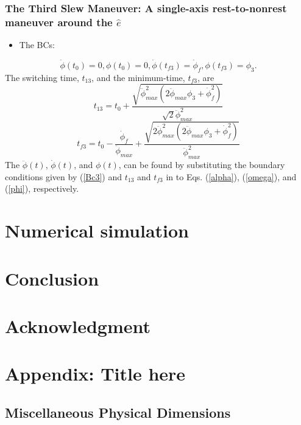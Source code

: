 \documentclass[letterpaper, preprint, paper,11pt]{AAS}	%
\begin{document}
			\subsubsection{The Third Slew Maneuver: A single-axis rest-to-nonrest maneuver around the $\hat{e}$}
			
			
			\begin{itemize}
				\item The BCs: 
			\end{itemize}
			\begin{equation}\label{Bc3}
			\dot{\phi}(t_0)=0,\phi(t_0)=0, \dot{\phi}(t_{f3})=\dot{\phi}_{f},\phi(t_{f3})=\phi_3.
			\end{equation}
			The switching time, $t_{13}$, and the minimum-time, $t_{f3}$, are
			\begin{equation}\label{t31}
			t_{13}=t_0+\frac{\sqrt{\ddot{\phi}_{max}^2(2\ddot{\phi}_{max}\phi_3+\dot{\phi}_{f}^2)}}{\sqrt{2}\ddot{\phi}_{max}^2}
			\end{equation}
			\begin{equation}\label{tf3}
			t_{f3}=t_0-\frac{\dot{\phi}_{f}}{\ddot{\phi}_{max}}+\frac{\sqrt{2\ddot{\phi}_{max}^2(2\ddot{\phi}_{max}\phi_3+\dot{\phi}_{f}^2)}}{\ddot{\phi}_{max}^2}
			\end{equation}
			The $\ddot{\phi}(t)$, $\dot{\phi}(t)$, and  $\phi(t)$,  can be found by substituting the boundary conditions given by (\ref{Bc3}) and $t_{13}$ and $t_{f3}$ in to Eqs. (\ref{alpha}), (\ref{omega}), and (\ref{phi}), respectively.
			
	
\section{Numerical simulation} 

\section{Conclusion}

\section{Acknowledgment}

\appendix
\section*{Appendix: Title here}

\subsection*{Miscellaneous Physical Dimensions}

\end{document}
